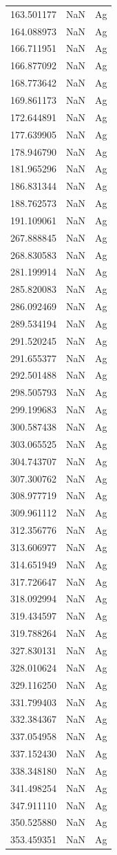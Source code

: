 \begin{longtable}{rrl}
163.501177 & NaN & Ag \\
164.088973 & NaN & Ag \\
166.711951 & NaN & Ag \\
166.877092 & NaN & Ag \\
168.773642 & NaN & Ag \\
169.861173 & NaN & Ag \\
172.644891 & NaN & Ag \\
177.639905 & NaN & Ag \\
178.946790 & NaN & Ag \\
181.965296 & NaN & Ag \\
186.831344 & NaN & Ag \\
188.762573 & NaN & Ag \\
191.109061 & NaN & Ag \\
267.888845 & NaN & Ag \\
268.830583 & NaN & Ag \\
281.199914 & NaN & Ag \\
285.820083 & NaN & Ag \\
286.092469 & NaN & Ag \\
289.534194 & NaN & Ag \\
291.520245 & NaN & Ag \\
291.655377 & NaN & Ag \\
292.501488 & NaN & Ag \\
298.505793 & NaN & Ag \\
299.199683 & NaN & Ag \\
300.587438 & NaN & Ag \\
303.065525 & NaN & Ag \\
304.743707 & NaN & Ag \\
307.300762 & NaN & Ag \\
308.977719 & NaN & Ag \\
309.961112 & NaN & Ag \\
312.356776 & NaN & Ag \\
313.606977 & NaN & Ag \\
314.651949 & NaN & Ag \\
317.726647 & NaN & Ag \\
318.092994 & NaN & Ag \\
319.434597 & NaN & Ag \\
319.788264 & NaN & Ag \\
327.830131 & NaN & Ag \\
328.010624 & NaN & Ag \\
329.116250 & NaN & Ag \\
331.799403 & NaN & Ag \\
332.384367 & NaN & Ag \\
337.054958 & NaN & Ag \\
337.152430 & NaN & Ag \\
338.348180 & NaN & Ag \\
341.498254 & NaN & Ag \\
347.911110 & NaN & Ag \\
350.525880 & NaN & Ag \\
353.459351 & NaN & Ag \\
\end{longtable}
